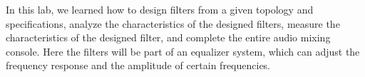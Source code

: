 In this lab, we learned how to design filters from a given topology and specifications, analyze
the characteristics of the designed filters, measure the characteristics of the designed filter, and complete the entire audio mixing console. Here the filters will be part of an equalizer system, which can adjust the frequency response and the amplitude of certain frequencies.